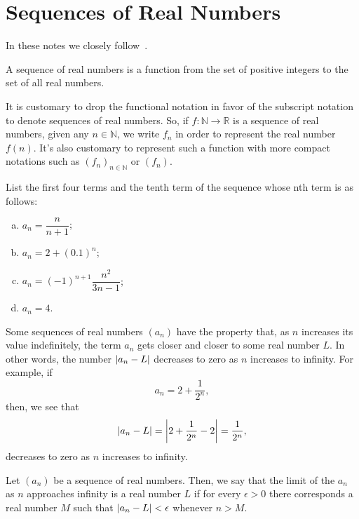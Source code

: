 \chapter{Sequences of Real Numbers}\label{chp:sequences-of-real-numbers}

In these notes we closely follow~\cite{swokowski1979calculus}.

\begin{definition}\label{def:sequences-of-real-numbers}
  A sequence of real numbers is a function from the set of positive integers to the set of all real numbers.
\end{definition}

It is customary to drop the functional notation in favor of the subscript notation to denote sequences of real numbers. So, if $f:\mathbb{N}\to\mathbb{R}$ is a sequence of real numbers, given any $n\in\mathbb{N}$, we write $f_{n}$ in order to represent the real number $f(n)$. It's also customary to represent such a function with more compact notations such as $(f_{n})_{n\in\mathbb{N}}$ or $(f_{n})$.

\begin{example}
  List the first four terms and the tenth term of the sequence whose nth term is as follows:
  \begin{enumerate}[(a)]
    \item
      $a_{n}=\dfrac{n}{n+1}$;
    \item
      $a_{n}=2+(0.1)^{n}$;
    \item
      $a_{n}=(-1)^{n+1}\dfrac{n^{2}}{3n-1}$;
    \item
      $a_{n}=4$.
  \end{enumerate}
\end{example}

Some sequences of real numbers $(a_{n})$ have the property that, as $n$ increases its value indefinitely, the term $a_{n}$ gets closer and closer to some real number $L$. In other words, the number $\abs{a_{n}-L}$ decreases to zero as $n$ increases to infinity. For example, if
\[
  a_{n}=2+\dfrac{1}{2^{n}},
\]
then, we see that
\[
  \abs{a_{n}-L}=\abs*{2+\dfrac{1}{2^{n}}-2}=\dfrac{1}{2^{n}},
\]
decreases to zero as $n$ increases to infinity.

\begin{definition}\label{def:the-limit-of-a-sequence-of-real-numbers}
  Let $(a_{n})$ be a sequence of real numbers. Then, we say that the limit of the $a_{n}$ as $n$ approaches infinity is a real number $L$ if for every $\epsilon>0$ there corresponds a real number $M$ such that $\abs{a_{n}-L}<\epsilon$ whenever $n>M$.
\end{definition}

